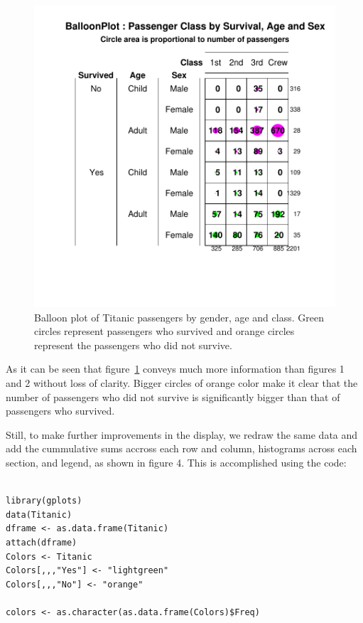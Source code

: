 \documentclass[a4paper]{report}
\begin{document}
\begin{article}
\begin{figure}
\includegraphics[width=\textwidth]{Figure3.pdf}
\caption{\label{figure:Figure3}
Balloon plot of Titanic passengers by gender, age and class. Green
circles represent passengers who survived and orange circles
represent the passengers who did not survive.}
\end{figure}

As it can be seen that figure~\ref{figure:Figure3} conveys much more
information than figures 1 and 2 without loss of clarity. Bigger
circles of orange color make it clear that the number of passengers
who did not survive is significantly bigger than that of passengers
who survived.


Still, to make further improvements in the display, we redraw the
same data and add the cummulative sums accross each row and column,
 histograms across each section, and legend, as shown in figure 4.
  This is accomplished using the code:

{
\small
\begin{verbatim}

library(gplots)
data(Titanic)
dframe <- as.data.frame(Titanic) 
attach(dframe)
Colors <- Titanic
Colors[,,,"Yes"] <- "lightgreen"
Colors[,,,"No"] <- "orange"

colors <- as.character(as.data.frame(Colors)$Freq)


\end{verbatim}}
\end{article}
\end{document}
